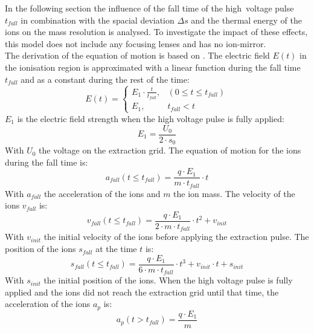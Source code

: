 	In the following section the influence of the fall time of the high~voltage pulse $t_{fall}$ in combination with the spacial deviation $\Delta s$ and the thermal energy of the ions on the mass resolution is analysed. To investigate the impact of these effects, this model does not include any focusing lenses and has no ion-mirror.\\
	The derivation of the equation of motion is based on \cite{Diss_Abplanalp}. The electric field $E(t)$ in the ionisation region is approximated with a linear function during the fall time $t_{fall}$ and as a constant during the rest of the time:
	\begin{equation}
		E(t) =
		\begin{cases}
			E_1\cdot\frac{t}{t_{fall}},& (0\leq t\leq t_{fall})\\
			E_1,& t_{fall} < t
		\end{cases}
	\label{eq:PulseEt}
	\end{equation}
	$E_1$ is the electric field strength when the high voltage pulse is fully applied:
	\begin{equation}
		E_1 = \frac{U_0}{2\cdot s_0}
	\end{equation}
	With $U_0$ the voltage on the extraction grid. The equation of motion for the ions during the fall time is:
	\begin{equation}
		a_{fall}(t\leq t_{fall}) = \frac{q\cdot E_1}{m\cdot t_{fall}}\cdot t
		\label{eq:afall}
	\end{equation}
	With $a_{fall}$ the acceleration of the ions and $m$ the ion mass. The velocity of the ions $v_{fall}$ is:
	\begin{equation}
		v_{fall}(t\leq t_{fall}) = \frac{q\cdot E_1}{2\cdot m\cdot t_{fall}}\cdot t^2 + v_{init}\label{eq:vfall}
	\end{equation}
	With $v_{init}$ the initial velocity of the ions before applying the extraction pulse. The position of the ions $s_{fall}$ at the time $t$ is:
	\begin{equation}
		s_{fall}(t\leq t_{fall}) = \frac{q\cdot E_1}{6\cdot m\cdot t_{fall}}\cdot t^3 + v_{init}\cdot t + s_{init}
		\label{eq:sfall}
	\end{equation}
	With $s_{init}$ the initial position of the ions. When the high voltage pulse is fully applied and the ions did not reach the extraction grid until that time, the acceleration of the ions $a_{p}$ is:
	\begin{equation}
		a_{p}(t > t_{fall}) = \frac{q\cdot E_1}{m}
		\label{eq:ap}
	\end{equation}

